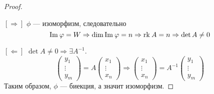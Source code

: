 \begin{proof}
\ 
\par $[\Rightarrow]$ $\phi$ --- изоморфизм, следовательно 
    \[
        \mathrm{Im\:} \varphi = W \Rightarrow \dim \mathrm{Im\:} \varphi = n \Rightarrow \mathrm{rk}\: A = n
        \Rightarrow \det A \neq 0
    \]
\par $[\Leftarrow]$ $\det A \neq 0 \Rightarrow \exists A^{-1}$.
\[ \begin{pmatrix} 
    y_1\\
    \vdots\\
    y_m
\end{pmatrix} = A 
\begin{pmatrix}
x_1\\
\vdots\\
x_n
\end{pmatrix}
\Rightarrow 
\begin{pmatrix}
x_1\\
\vdots\\
x_n
\end{pmatrix} = A^{-1} \begin{pmatrix} 
    y_1\\
    \vdots\\
    y_m
\end{pmatrix}
\]
Таким образом, $\phi$ --- биекция, а значит изоморфизм.
\end{proof}

